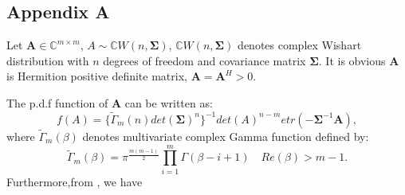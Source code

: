 \documentclass[12pt,letter,final]{article}
\begin{document}
\begin{spacing}{2.5}

%
%
%
\begin{appendices}
\section{Appendix A}
Let $\mathbf{A}\in \mathbb{C}^{m\times m}$, $A\sim \mathbb{C}W(n, \mathbf{\Sigma})$, $\mathbb{C}W(n, \mathbf{\Sigma})$ denotes complex Wishart distribution with $n$ degrees of freedom and covariance matrix $\mathbf{\Sigma}$. It is obvious $\mathbf{A}$ is Hermition positive definite matrix, $\mathbf{A}=\mathbf{A}^{H}>0$.

The p.d.f function of $\mathbf{A}$ can be written as\cite{nagar2011expectations}:
\begin{equation}
f(A)=\{\tilde{\Gamma}_{m}(n)det(\mathbf{\Sigma})^{n} \}^{-1}det(A)^{n-m}etr(-\mathbf{\Sigma}^{-1}\mathbf{A}),
\label{Appendequa1}
\end{equation}
where $\tilde{\Gamma}_{m}(\beta)$ denotes multivariate complex Gamma function defined by:
\begin{equation}
\tilde{\Gamma}_{m}(\beta)=\pi^{\frac{m(m-1)}{2}}\prod_{i=1}^{m}\Gamma(\beta-i+1)\quad Re(\beta)>m-1.
\label{Appendequa2}
\end{equation}
Furthermore,from \cite{nagar2011expectations}, we have 


\end{appendices}
\end{spacing}
\end{document}
